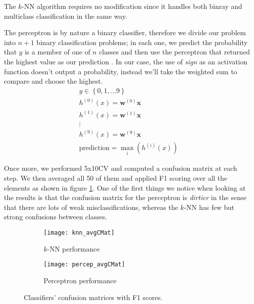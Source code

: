 The $k$-NN algorithm requires no modification since it handles both binray and multiclass classification in the same way. 

The perceptron is by nature a binary classifier, therefore we divide our problem into $n+1$ binary classification problems; in each one, we predict the probability that $y$ is a member of one of $n$ classes and then use the perceptron that returned the highest value as our prediction \cite{coursera-ML}. In our case, the use of \textit{sign} as an activation function doesn't output a probability, instead we'll take the weighted sum to compare and choose the highest.
\begin{gather*}
y \in \left\lbrace 0, 1, ... 9 \right\rbrace  \\
h^{(0)}(x) = \boldsymbol{w}^{(0)} \boldsymbol{x} \\
h^{(1)}(x) = \boldsymbol{w}^{(1)} \boldsymbol{x} \\
\vdots \\
h^{(9)}(x) = \boldsymbol{w}^{(9)} \boldsymbol{x} \\
\text{prediction} = \max_i(h^{(i)}(x))
\end{gather*}

Once more, we performed 5x10CV and computed a confusion matrix at each step. We then averaged all 50 of them and applied F1 scoring over all the elements as shown in figure \ref{fig:avg_CMats}. One of the first things we notice when looking at the results is that the confusion matrix for the perceptron is \textit{dirtier} in the sense that there are lots of weak misclassifications, whereas the $k$-NN has few but strong confusions between classes.
\begin{figure}[]
	\centering
	\begin{subfigure}[]{0.4\textwidth}
		\centering
		\texttt{[image: knn\_avgCMat]}
		\caption{$k$-NN performance}
	\end{subfigure}
	\begin{subfigure}[]{0.4\textwidth}
		\centering
		\texttt{[image: percep\_avgCMat]}
		\caption{Perceptron performance}
	\end{subfigure}
	\caption{Classifiers' confusion matrices with F1 scores.}
	\label{fig:avg_CMats}
\end{figure}

